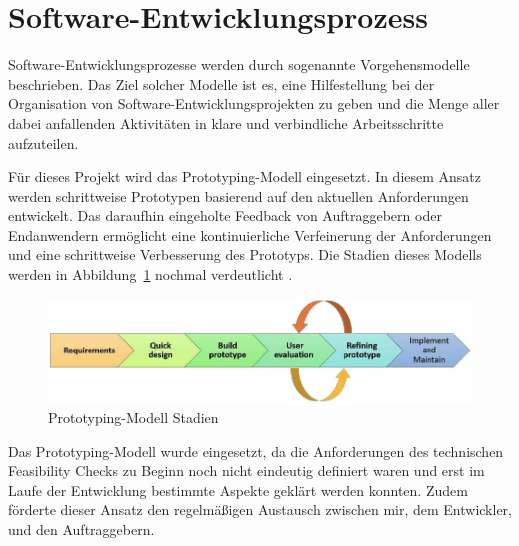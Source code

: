 \section{Software-Entwicklungsprozess}
Software-Entwicklungsprozesse werden durch sogenannte Vorgehensmodelle beschrieben. Das Ziel solcher Modelle ist es, eine Hilfestellung bei der Organisation von Software-Entwicklungsprojekten zu geben und die Menge aller dabei anfallenden Aktivitäten in klare und verbindliche Arbeitsschritte aufzuteilen. 

Für dieses Projekt wird das Prototyping-Modell eingesetzt. In diesem Ansatz werden schrittweise Prototypen basierend auf den aktuellen Anforderungen entwickelt. Das daraufhin eingeholte Feedback von Auftraggebern oder Endanwendern ermöglicht eine kontinuierliche Verfeinerung der Anforderungen und eine schrittweise Verbesserung des Prototyps. Die Stadien dieses Modells werden in Abbildung~\ref{fig:Prototyping-Modell} nochmal verdeutlicht \cite{senarath2021waterfall}.

\begin{figure}[h!]
    \centering
    \includegraphics[]{bilder/Prototyping_Stages.jpg}
    \caption{Prototyping-Modell Stadien}
    \label{fig:Prototyping-Modell}
\end{figure}


Das Prototyping-Modell wurde eingesetzt, da die Anforderungen des technischen Feasibility Checks zu Beginn noch nicht eindeutig definiert waren und erst im Laufe der Entwicklung bestimmte Aspekte geklärt werden konnten. Zudem förderte dieser Ansatz den regelmäßigen Austausch zwischen mir, dem Entwickler, und den Auftraggebern.